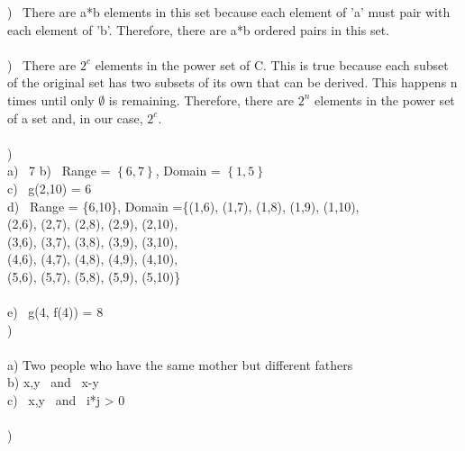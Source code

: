 \documentclass{article}
\begin{document}
) \ There are a*b elements in this set because each element of 'a' must pair with each element of 'b'.  Therefore, there are a*b ordered pairs in this set.
\\ \\
) \ There are $2^c$ elements in the power set of C. This is true because each subset of the original set has two subsets of its own that can be derived.  This happens n times until only $\emptyset$ is remaining.  Therefore, there are $2^n$ elements in the power set of a set and, in our case, $2^c$.
\\ \\
)\\
a) \ 7
b) \ Range = $\left\{6,7\right\}$, Domain = $\left\{1,5\right\}$\\
c) \ g(2,10) = 6\\
d) \ Range = \{6,10\}, Domain =\{(1,6), (1,7), (1,8), (1,9), (1,10), \\ (2,6), (2,7), (2,8), (2,9), (2,10), \\ (3,6), (3,7), (3,8), (3,9), (3,10), \\ (4,6), (4,7), (4,8), (4,9), (4,10), \\ (5,6), (5,7), (5,8), (5,9), (5,10)\}\\ \\
e) \ g(4, f(4)) = 8\\

) \\ \\
a) Two people who have the same mother but different fathers \\
b) x,y \in {} \ and \ x-y  \\
c) \ x,y \in {} \ and \ i*j > 0 \\ \\
) \\

\\ \\
\end{document}
